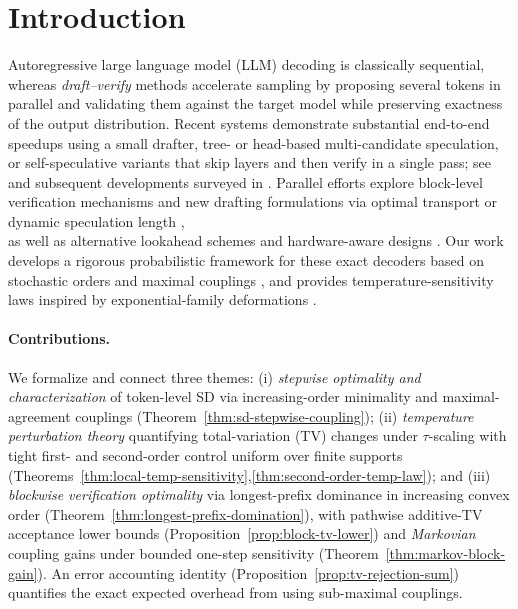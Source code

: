 \documentclass[twoside]{article}
\theoremstyle{plain}
\theoremstyle{definition}
\theoremstyle{remark}
\begin{document}
\section{Introduction}
\begin{sloppypar}
Autoregressive large language model (LLM) decoding is classically sequential, whereas \emph{draft--verify} methods accelerate sampling by proposing several tokens in parallel and validating them against the target model while preserving exactness of the output distribution. Recent systems demonstrate substantial end-to-end speedups using a small drafter, tree- or head-based multi-candidate speculation, or self-speculative variants that skip layers and then verify in a single pass; see \cite{Leviathan2023SpeculativeDecoding,Xia2022SpeculativeDecoding} and subsequent developments surveyed in \cite{Xia2024Survey}. Parallel efforts explore block-level verification mechanisms \cite{Sun2024BlockVerification} and new drafting formulations via optimal transport or dynamic speculation length \cite{Sun2023SpecTr,Mamou2024DISCO}, \\ \linebreak as well as alternative lookahead schemes \cite{Fu2024Lookahead} and hardware-aware designs \cite{Chen2024Sequoia}. Our work develops a rigorous probabilistic framework for these exact decoders based on stochastic orders \cite{ShakedShanthikumar2007StochasticOrders} and maximal couplings \cite{Lindvall2002CouplingMethod}, and provides temperature-sensitivity laws inspired by exponential-family deformations \cite{Naudts2009QExponentialFamily}.
\end{sloppypar}

\paragraph{Contributions.}
We formalize and connect three themes: (i) \emph{stepwise optimality and characterization} of token-level SD via increasing-order minimality and maximal-agreement couplings (Theorem~\ref{thm:sd-stepwise-coupling}); (ii) \emph{temperature perturbation theory} quantifying total-variation (TV) changes under $\tau$-scaling with tight first- and second-order control uniform over finite supports (Theorems~\ref{thm:local-temp-sensitivity},\ref{thm:second-order-temp-law}); and (iii) \emph{blockwise verification optimality} via longest-prefix dominance in increasing convex order (Theorem~\ref{thm:longest-prefix-domination}), with pathwise additive-TV acceptance lower bounds (Proposition~\ref{prop:block-tv-lower}) and \emph{Markovian} coupling gains under bounded one-step sensitivity (Theorem~\ref{thm:markov-block-gain}). An error accounting identity (Proposition~\ref{prop:tv-rejection-sum}) quantifies the exact expected overhead from using sub-maximal couplings.
\end{document}
